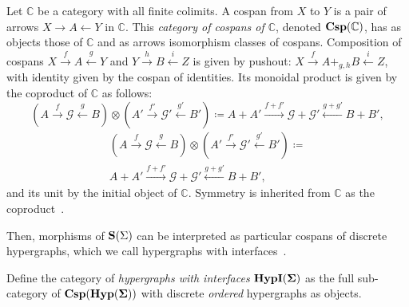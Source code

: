 \begin{definition}
Let $\mathbb{C}$ be a category with all finite colimits.  A cospan from $X$ to $Y$ is a pair of arrows $X \xrightarrow{} A \xleftarrow{} Y$  in $\mathbb{C}$.  This \textit{category of cospans of $\mathbb{C}$},  denoted $\mathbf{Csp(\mathbb{C})}$,  has as objects those of $\mathbb{C}$ and as arrows isomorphism classes of cospans.
Composition of cospans $X \xrightarrow{f} A \xleftarrow{g} Y$ and $Y \xrightarrow{h} B \xleftarrow{i} Z$ is given by pushout: $X \xrightarrow{f} A +_{g,h} B \xleftarrow{i} Z$,  with identity given by the cospan of identities.  Its monoidal product is given by the coproduct of $\mathbb{C}$ as follows: 
\ifdefined \ONECOLUMN
\[
    (A \xrightarrow{f} \mathcal{G} \xleftarrow{g} B) \otimes (A' \xrightarrow{f'} \mathcal{G'} \xleftarrow{g'} B') \coloneq A + A' \xrightarrow{f+f'} \mathcal{G} + \mathcal{G'} \xleftarrow{g+g'} B + B'  ,
\]
\else
\begin{multline*}
    (A \xrightarrow{f} \mathcal{G} \xleftarrow{g} B) \otimes (A' \xrightarrow{f'} \mathcal{G'} \xleftarrow{g'} B') \coloneq\\ A + A' \xrightarrow{f+f'} \mathcal{G} + \mathcal{G'} \xleftarrow{g+g'} B + B'  , 
\end{multline*}
\fi
and its unit by the initial object of $\mathbb{C}$.
Symmetry is inherited from $\mathbb{C}$ as the coproduct~\cite{MonoidalCoproduct}.
\end{definition}


Then, morphisms of $\mathbf{S}(\Sigma)$ can be interpreted as particular cospans of discrete hypergraphs,  which we call hypergraphs with interfaces~\cite{bonchi_string_2022-2}.
\begin{definition}
\label{def:cspd}
Define the category of \emph{hypergraphs with interfaces} $\mathbf{HypI(\Sigma)}$ as the full sub-category of $\mathbf{Csp(Hyp(\Sigma))}$ with discrete \textit{ordered} hypergraphs as objects.
\end{definition}

